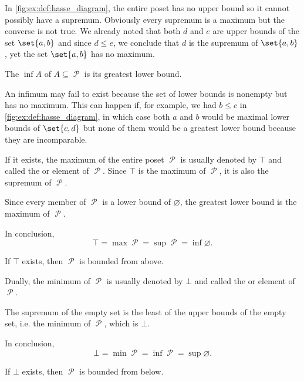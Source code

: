 \begin{definition}
\begin{thmenum}
\begin{minipage}[t]{0.45\textwidth}
      In \cref{fig:ex:def:hasse_diagram}, the entire poset has no upper bound so it cannot possibly have a supremum. Obviously every supremum is a maximum but the converse is not true. We already noted that both \( d \) and \( e \) are upper bounds of the set \( \set{ a, b } \) and since \( d \leq e \), we conclude that \( d \) is the supremum of \( \set{ a, b } \), yet the set \( \set{ a, b } \) has no maximum.
    \end{minipage}
    \hspace{0.02\textwidth}
    \begin{minipage}[t]{0.45\textwidth}
      The  \( \inf A \) of \( A \subseteq \mscrP \) is its greatest lower bound.

      An infimum may fail to exist because the set of lower bounds is nonempty but has no maximum. This can happen if, for example, we had \( b \leq c \) in \cref{fig:ex:def:hasse_diagram}, in which case both \( a \) and \( b \) would be maximal lower bounds of \( \set{ c, d } \) but none of them would be a greatest lower bound because they are incomparable.
    \end{minipage}

    \begin{minipage}[t]{0.45\textwidth}
      If it exists, the maximum of the entire poset \( \mscrP \) is usually denoted by \( \top \) and called the  or  element of \( \mscrP \). Since \( \top \) is the maximum of \( \mscrP \), it is also the supremum of \( \mscrP \).

      Since every member of \( \mscrP \) is a lower bound of \( \varnothing \), the greatest lower bound is the maximum of \( \mscrP \).

      In conclusion,
      \begin{equation*}
        \top = \max \mscrP = \sup \mscrP = \inf \varnothing.
      \end{equation*}

      If \( \top \) exists, then \( \mscrP \) is bounded from above.
    \end{minipage}
    \hspace{0.02\textwidth}
    \begin{minipage}[t]{0.45\textwidth}
      Dually, the minimum of \( \mscrP \) is usually denoted by \( \bot \) and called the  or  element of \( \mscrP \).

      The supremum of the empty set is the least of the upper bounds of the empty set, i.e. the minimum of \( \mscrP \), which is \( \bot \).

      In conclusion,
      \begin{equation*}
        \bot = \min \mscrP = \inf \mscrP = \sup \varnothing.
      \end{equation*}

      If \( \bot \) exists, then \( \mscrP \) is bounded from below.
    \end{minipage}
  \end{thmenum}
\end{definition}

